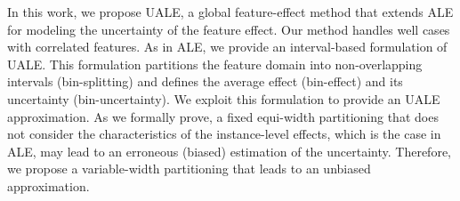 \documentclass[twoside]{article}
\newcommand{\todo}[1]{[\textcolor{red}{#1}]}
\begin{document}




In this work, we propose UALE, a global feature-effect method that
extends ALE for modeling the uncertainty of the feature effect.
Our method handles well cases with correlated features. 
As in ALE, we provide an interval-based formulation of UALE. 
This formulation partitions the feature domain into non-overlapping 
intervals (bin-splitting) and defines the average effect (bin-effect) and its uncertainty (bin-uncertainty). We exploit this formulation to provide an UALE approximation. 
As we formally prove, a fixed equi-width partitioning that does not consider
the characteristics of the instance-level effects, which is the case in ALE, 
may lead to an erroneous (biased) estimation of the uncertainty. 
Therefore, we propose a variable-width partitioning that leads to an unbiased approximation.



\end{document}
